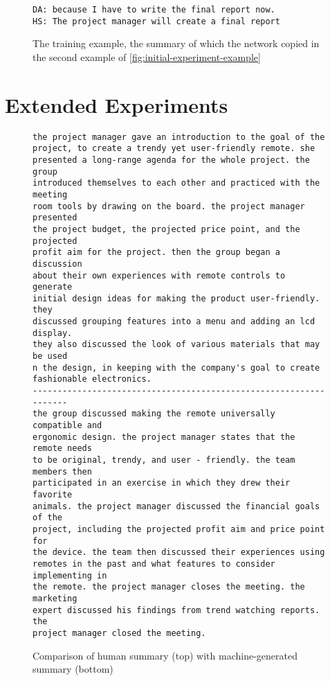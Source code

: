 \begin{figure}[h]
\begin{lstlisting}[numbers=none]
DA: because I have to write the final report now.
HS: The project manager will create a final report
\end{lstlisting}
\caption{The training example, the summary of which the network copied in the second example of \cref{fig:initial-experiment-example}}
\label{fig:initial-experiment-training-example}
\end{figure}


\section{Extended Experiments}

\begin{figure}[h]
\begin{lstlisting}[numbers=none]
the project manager gave an introduction to the goal of the
project, to create a trendy yet user-friendly remote. she
presented a long-range agenda for the whole project. the group
introduced themselves to each other and practiced with the meeting
room tools by drawing on the board. the project manager presented
the project budget, the projected price point, and the projected
profit aim for the project. then the group began a discussion
about their own experiences with remote controls to generate
initial design ideas for making the product user-friendly. they
discussed grouping features into a menu and adding an lcd display.
they also discussed the look of various materials that may be used 
n the design, in keeping with the company's goal to create
fashionable electronics. 
------------------------------------------------------------------
the group discussed making the remote universally compatible and
ergonomic design. the project manager states that the remote needs
to be original, trendy, and user - friendly. the team members then
participated in an exercise in which they drew their favorite
animals. the project manager discussed the financial goals of the
project, including the projected profit aim and price point for
the device. the team then discussed their experiences using
remotes in the past and what features to consider implementing in
the remote. the project manager closes the meeting. the marketing
expert discussed his findings from trend watching reports. the
project manager closed the meeting. 
\end{lstlisting}
\caption{Comparison of human summary (top) with machine-generated summary (bottom)}
\label{fig:extended-experiment-example}
\end{figure}

